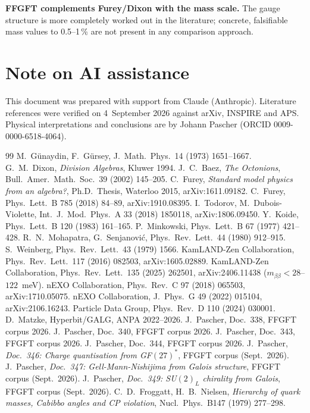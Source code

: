 \textbf{FFGFT complements Furey/Dixon with the mass scale.} The gauge structure
is more completely worked out in the literature; concrete, falsifiable mass
values to 0.5--1\,\% are not present in any comparison approach.

\section*{Note on AI assistance}

This document was prepared with support from Claude (Anthropic).
Literature references were verified on 4~September 2026 against arXiv, INSPIRE and APS.
Physical interpretations and conclusions are by
Johann Pascher (ORCID 0009-0000-6518-4064).

\begin{thebibliography}{99}
 M.~Günaydin, F.~Gürsey, J.~Math.\ Phys.\ 14 (1973) 1651--1667.
 G.~M.~Dixon, \textit{Division Algebras}, Kluwer 1994.
 J.~C.~Baez, \textit{The Octonions}, Bull.\ Amer.\ Math.\ Soc.\ 39 (2002) 145--205.
 C.~Furey, \textit{Standard model physics from an algebra?}, Ph.D.\ Thesis, Waterloo 2015, arXiv:1611.09182.
 C.~Furey, Phys.\ Lett.\ B 785 (2018) 84--89, arXiv:1910.08395.
 I.~Todorov, M.~Dubois-Violette, Int.\ J.\ Mod.\ Phys.\ A 33 (2018) 1850118, arXiv:1806.09450.
 Y.~Koide, Phys.\ Lett.\ B 120 (1983) 161--165.
 P.~Minkowski, Phys.\ Lett.\ B 67 (1977) 421--428.
 R.~N.~Mohapatra, G.~Senjanović, Phys.\ Rev.\ Lett.\ 44 (1980) 912--915.
 S.~Weinberg, Phys.\ Rev.\ Lett.\ 43 (1979) 1566.
 KamLAND-Zen Collaboration, Phys.\ Rev.\ Lett.\ 117 (2016) 082503, arXiv:1605.02889.
 KamLAND-Zen Collaboration, Phys.\ Rev.\ Lett.\ 135 (2025) 262501, arXiv:2406.11438 ($m_{\beta\beta}<28$--$122$~meV).
 nEXO Collaboration, Phys.\ Rev.\ C 97 (2018) 065503, arXiv:1710.05075.
 nEXO Collaboration, J.~Phys.\ G 49 (2022) 015104, arXiv:2106.16243.
 Particle Data Group, Phys.\ Rev.\ D 110 (2024) 030001.
 D.~Matzke, Hyperbit/GALG, ANPA 2022--2026.
 J.~Pascher, Doc.~338, FFGFT corpus 2026.
 J.~Pascher, Doc.~340, FFGFT corpus 2026.
 J.~Pascher, Doc.~343, FFGFT corpus 2026.
 J.~Pascher, Doc.~344, FFGFT corpus 2026.
 J.~Pascher, \textit{Doc.~346: Charge quantisation from GF$(27)^*$}, FFGFT corpus (Sept.\ 2026).
 J.~Pascher, \textit{Doc.~347: Gell-Mann-Nishijima from Galois structure}, FFGFT corpus (Sept.\ 2026).
 J.~Pascher, \textit{Doc.~349: SU$(2)_L$ chirality from Galois}, FFGFT corpus (Sept.\ 2026).
 C.~D.~Froggatt, H.~B.~Nielsen,
\textit{Hierarchy of quark masses, Cabibbo angles and CP violation},
Nucl.\ Phys.\ B147 (1979) 277--298.
\end{thebibliography}
